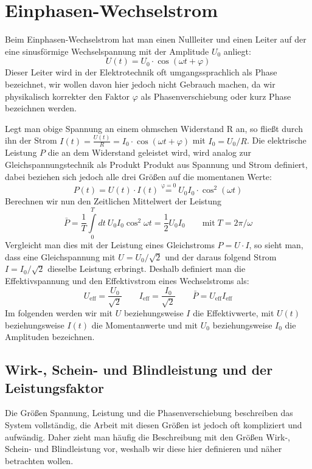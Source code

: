 
\section{Einphasen-Wechselstrom}\label{wechsel}
Beim Einphasen-Wechselstrom hat man einen Nullleiter und einen Leiter auf der eine sinusförmige Wechselspannung mit der Amplitude $U_0$ anliegt:
\begin{equation}
U(t)=U_0 \cdot \cos(\omega t + \varphi)
\end{equation}
Dieser Leiter wird in der Elektrotechnik oft umgangssprachlich als Phase bezeichnet, wir wollen davon hier jedoch nicht Gebrauch machen, da wir physikalisch korrekter den Faktor $\varphi$ als Phasenverschiebung oder kurz Phase bezeichnen werden.

Legt man obige Spannung an einem ohmschen Widerstand R an, so fließt durch ihn der Strom $I(t)= \frac{U(t)}{R} = I_0 \cdot \cos(\omega t + \varphi)$ mit $I_0 = U_0/R$.
Die elektrische Leistung $P$ die an dem Widerstand geleistet wird, wird analog zur Gleichspannungstechnik als Produkt Produkt aus Spannung und Strom definiert, dabei beziehen sich jedoch alle drei Größen auf die momentanen Werte:
\begin{equation}
P(t) = U(t) \cdot I(t) \stackrel{\mathrm{\varphi=0}}= U_0 I_0 \cdot \cos^2(\omega t)
\end{equation}
Berechnen wir nun den Zeitlichen Mittelwert der Leistung
\begin{equation}\label{Wirkleistung_ohne_phi}
\bar{P}=\frac1T \int\limits_0^T dt\: U_0 I_0 \cos^2 \omega t = \frac12 U_0 I_0 \qquad\mathrm{mit}\; T=2\pi/\omega
\end{equation}
Vergleicht man dies mit der Leistung eines Gleichstroms $P=U\cdot I$, so sieht man, dass eine Gleichspannung mit $U=U_0 / \sqrt2$ und der daraus folgend Strom $I=I_0 / \sqrt2$ dieselbe Leistung erbringt.
Deshalb definiert man die Effektivspannung und den Effektivstrom eines Wechselstroms als:
\begin{equation*}
U_{\mathrm{eff}} = \frac{U_0}{\sqrt2} \qquad I_{\mathrm{eff}} = \frac{I_0}{\sqrt2} \qquad \bar{P}=U_{\mathrm{eff}}I_{\mathrm{eff}}
\end{equation*}
Im folgenden werden wir mit $U$ beziehungsweise $I$ die Effektivwerte, mit $U(t)$ beziehungsweise $I(t)$ die Momentanwerte und mit $U_0$ beziehungsweise $I_0$ die Amplituden bezeichnen.





\subsection{Wirk-, Schein- und Blindleistung und der Leistungsfaktor}
Die Größen Spannung, Leistung und die Phasenverschiebung beschreiben das System vollständig, die Arbeit mit diesen Größen ist jedoch oft kompliziert und aufwändig. Daher zieht man häufig die Beschreibung mit den Größen Wirk-, Schein- und Blindleistung vor, weshalb wir diese hier definieren und näher betrachten wollen.

